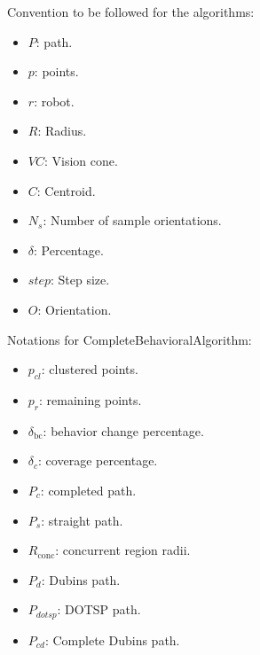 Convention to be followed for the algorithms:
\begin{multicols}{2}
\begin{itemize}[noitemsep,topsep=0pt]
    \item $P$: path.
    \item $p$: points.
    \item $r$: robot.
    \item $R$: Radius.
    \item $VC$: Vision cone.
    \item $C$: Centroid.
    \item $N_s$: Number of sample orientations.
    \item $ \delta$: Percentage.
    \item $step$: Step size.
    \item $O$: Orientation.
\end{itemize}
\end{multicols}

\vspace*{6mm}  

Notations for CompleteBehavioralAlgorithm:
\begin{multicols}{2}
\begin{itemize}[noitemsep,topsep=0pt]
    \item $p_{cl}$: clustered points.
    \item $p_r$: remaining points.
    \item $\delta_{\text{bc}}$: behavior change percentage.
    \item $\delta_c$: coverage percentage.
    \item $P_c$: completed path.
    \item $P_s$: straight path.
    \item $R_{\text{conc}}$: concurrent region radii.
    \item $P_d$: Dubins path.
    \item $P_{dotsp}$: DOTSP path.
    \item $P_{cd}$: Complete Dubins path.
\end{itemize}
\end{multicols}

